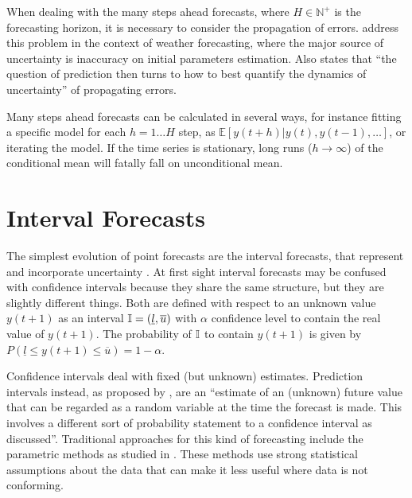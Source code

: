 When dealing with the many steps ahead forecasts, where $H \in \mathbb{N}^+$ is the forecasting horizon, it is necessary to consider the propagation of errors. \cite{Leutbecher2008} address this problem in the context of weather forecasting, where the major source of uncertainty is inaccuracy on initial parameters estimation. Also \cite{Smith2001} states that ``the question of prediction then turns to how to best quantify the dynamics of uncertainty'' of propagating errors.

Many steps ahead forecasts can be calculated in several ways, for instance fitting a specific model for each $h = 1\ldots H$ step, as $\mathbb{E}[y(t+h)|y(t),y(t-1),\ldots]$, or iterating the model. If the time series is stationary, long runs ($h \rightarrow \infty$) of the conditional mean will fatally fall on unconditional mean.



%
\section{Interval Forecasts}
\label{sec:prob_interval}

The simplest evolution of point forecasts are the interval forecasts, that represent and incorporate uncertainty \cite{Hansen2006}. At first sight interval forecasts may be confused with confidence intervals because they share the same structure, but they are slightly different things. Both are defined with respect to an unknown value $y(t+1)$ as an interval $\mathbb{I} = (\underline{l},\overline{u})$  with $\alpha$ confidence level to contain the real value of $y(t+1)$. The probability of $\mathbb{I}$ to contain $y(t+1)$ is given by $P(\underline{l} \leq y(t+1) \leq \overline{u}) = 1 - \alpha$.


Confidence intervals deal with fixed (but unknown) estimates. Prediction intervals instead, as proposed by \cite{Chatfield1993}, are an ``estimate of an (unknown) future value that can be regarded as a random variable at the time the forecast is made. This involves a different sort of probability statement to a confidence interval as discussed''. Traditional approaches for this kind of forecasting include the parametric methods as studied in  \cite{Chatfield1993}. These methods use strong statistical assumptions about the data that can make it less useful where data is not conforming.

